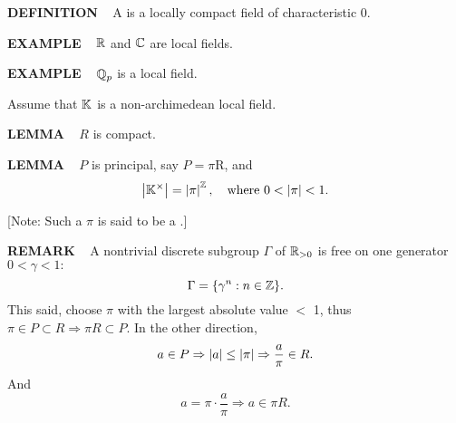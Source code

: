 \vspace{0.1cm}

\begin{x}{\small\bf DEFINITION} \ %
A 
 is a locally compact field of characteristic 0.
\end{x}

\vspace{0.1cm}

\begin{x}{\small\bf EXAMPLE} \ %
$\mathbb{R}$ and $\mathbb{C}$ are local fields.
\end{x}

\vspace{0.1cm}

\begin{x}{\small\bf EXAMPLE} \ %
$\mathbb{Q}_{p}$ is a local field.
\end{x}

\vspace{0.1cm}

Assume that $\mathbb{K}$ is a non-archimedean local field.

\vspace{0.1cm}

\begin{x}{\small\bf LEMMA} \ %
$R$ is compact.
\end{x}

\vspace{0.1cm}

\begin{x}{\small\bf LEMMA} \ %
$P$ is principal, say $P = \pi$R, and 
\[
\left\vert\mathbb{K}^\times\right\vert  = \left\vert\pi\right\vert^{\mathbb{Z}}, \quad \text{where } 0 < \left\vert\pi\right\vert < 1.
\]
\end{x}

\vspace{0.1cm}

[Note: Such a $\pi$ is said to be a .]

\vspace{0.1cm}

\begin{x}{\small\bf REMARK} \ %
A nontrivial discrete subgroup $\Gamma$ of $\mathbb{R}_{>0}$ is free on one generator $ 0 < \gamma < 1:$
\[
\Gamma = \{\gamma^n:n \in \mathbb{Z}\}.
\]
This said, choose $\pi$ with the largest absolute value $<$ 1, thus $\pi \in P \subset  R \Rightarrow \pi R \subset P.$
In the other direction, 
\[
a \in P \Rightarrow \left\vert a\right\vert \le \left\vert\pi\right\vert \Rightarrow \frac{a}{\pi} \in R.
\]
And
\[
a = \pi \cdot \frac{a}{\pi}  \Rightarrow a \in \pi R.
\]
\end{x}

